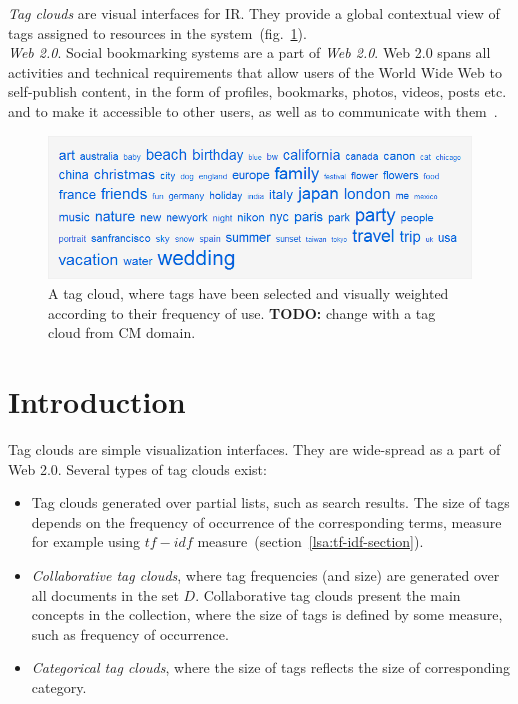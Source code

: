 \textit{Tag clouds} are visual interfaces for \gls{IR}. They provide a global contextual view of tags assigned to resources in the system~(fig.~\ref{fig:tagcloud}). \\

\textit{Web 2.0}. Social bookmarking systems are a part of \textit{Web 2.0}. Web 2.0 spans all activities and technical requirements that allow users of the World Wide Web to self-publish content, in the form of profiles, bookmarks, photos, videos, posts etc. and to make it accessible to other users, as well as to communicate with them~\cite{folksonomiesWeb2.0_2009}. \\


%
%
\begin{figure}[htbp]
	\centering
	\includegraphics[width=\ScaleIfNeeded]{img/tagcloud} 
	\caption[A tag cloud.]{A tag cloud, where tags have been selected and visually weighted according to their frequency of use. \textbf{TODO:} change with a tag cloud from CM domain. }
	\label{fig:tagcloud}
\end{figure}

\section{Introduction}
Tag clouds are simple visualization interfaces. They are wide-spread as a part of Web 2.0. Several types of tag clouds exist: \\
\begin{itemize}
\item Tag clouds generated over partial lists, such as search results. The size of tags depends on the frequency of occurrence of the corresponding terms, measure for example using $tf-idf$  measure~(section~\ref{lsa:tf-idf-section}).

\item \textit{Collaborative tag clouds}, where tag frequencies (and size) are generated over all documents in the set $D$. Collaborative tag clouds present the main concepts in the collection, where the size of tags is defined by some measure, such as frequency of occurrence. 

\item \textit{ Categorical tag clouds}, where the size of tags reflects the size of corresponding category. \\
\end{itemize}

